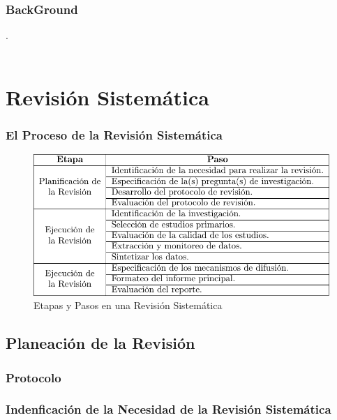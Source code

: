 \documentclass{beamer}
\begin{document}
\begin{frame}
	\frametitle{BackGround}
	.\\~\\
\end{frame}

\section{Revisión Sistemática} %
\begin{frame}
	\frametitle{El Proceso de la Revisión Sistemática}
	
	\begin{figure}[H]
		\begin{center}
			\includegraphics[scale=0.4]{images/1document/steps.png}
			\caption{Etapas y Pasos en una Revisión Sistemática}
			\label{Pasos}
		\end{center}
	\end{figure}
	
\end{frame}
\subsection{Planeación de la Revisión} %

\subsubsection{Protocolo} %

\subsubsection{Indenficación de la Necesidad de la Revisión Sistemática} %
\end{document}
